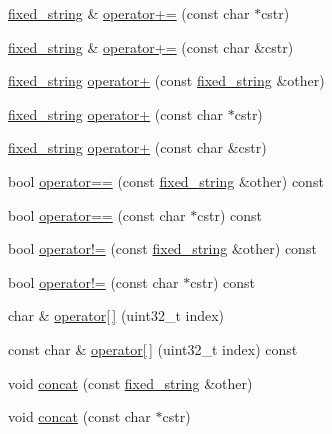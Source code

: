 \begin{DoxyCompactItemize}
\item 
\hyperlink{classcrap_1_1fixed__string}{fixed\+\_\+string} \& \hyperlink{classcrap_1_1fixed__string_a4f67a80d56bd97a6af06f40b28e53f9a}{operator+=} (const char $\ast$cstr)
\item 
\hyperlink{classcrap_1_1fixed__string}{fixed\+\_\+string} \& \hyperlink{classcrap_1_1fixed__string_aa8e24d7eb5959eadbe159816bf163afa}{operator+=} (const char \&cstr)
\item 
\hyperlink{classcrap_1_1fixed__string}{fixed\+\_\+string} \hyperlink{classcrap_1_1fixed__string_a04df16ab5b31a0c30b391b983f07f12c}{operator+} (const \hyperlink{classcrap_1_1fixed__string}{fixed\+\_\+string} \&other)
\item 
\hyperlink{classcrap_1_1fixed__string}{fixed\+\_\+string} \hyperlink{classcrap_1_1fixed__string_aa941e379d43695d936ea50ed3d172fdc}{operator+} (const char $\ast$cstr)
\item 
\hyperlink{classcrap_1_1fixed__string}{fixed\+\_\+string} \hyperlink{classcrap_1_1fixed__string_a42979c5dfdcf666d197a41d389b72962}{operator+} (const char \&cstr)
\item 
bool \hyperlink{classcrap_1_1fixed__string_a568aef374ab9ae52215c2711703a9598}{operator==} (const \hyperlink{classcrap_1_1fixed__string}{fixed\+\_\+string} \&other) const 
\item 
bool \hyperlink{classcrap_1_1fixed__string_aef9f742222c5b4bbd6b709f9c921c81c}{operator==} (const char $\ast$cstr) const 
\item 
bool \hyperlink{classcrap_1_1fixed__string_a31d238639dbe441fad73446f2a33294d}{operator!=} (const \hyperlink{classcrap_1_1fixed__string}{fixed\+\_\+string} \&other) const 
\item 
bool \hyperlink{classcrap_1_1fixed__string_a939f656170c71f5da297d57540b63116}{operator!=} (const char $\ast$cstr) const 
\item 
char \& \hyperlink{classcrap_1_1fixed__string_a3ebca4f1cd9eb212e18b497447405ae8}{operator\mbox{[}$\,$\mbox{]}} (uint32\+\_\+t index)
\item 
const char \& \hyperlink{classcrap_1_1fixed__string_a35927c0fbe9dd67cd230e079dc91d26a}{operator\mbox{[}$\,$\mbox{]}} (uint32\+\_\+t index) const 
\item 
void \hyperlink{classcrap_1_1fixed__string_adaab24ed42cc1a922a9274be9c9085e4}{concat} (const \hyperlink{classcrap_1_1fixed__string}{fixed\+\_\+string} \&other)
\item 
void \hyperlink{classcrap_1_1fixed__string_a488f566ab869c69d3b7b69d807b4c7b5}{concat} (const char $\ast$cstr)

\end{DoxyCompactItemize}
